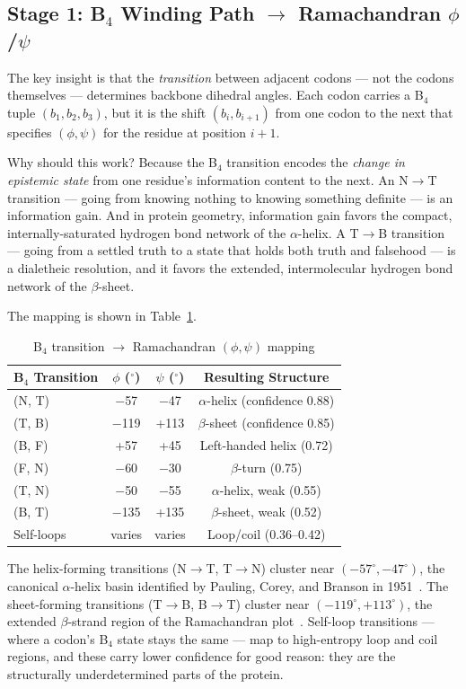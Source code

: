 \documentclass[11pt,a4paper,twocolumn]{article}
\begin{document}
\subsection{Stage 1: B$_4$ Winding Path $\to$ Ramachandran $\phi$/$\psi$}

The key insight is that the \emph{transition} between adjacent codons — not the codons themselves — determines backbone dihedral angles. Each codon carries a B$_4$ tuple $(b_1, b_2, b_3)$, but it is the shift $(b_i, b_{i+1})$ from one codon to the next that specifies $(\phi, \psi)$ for the residue at position $i+1$.

Why should this work? Because the B$_4$ transition encodes the \emph{change in epistemic state} from one residue's information content to the next. An N$\to$T transition — going from knowing nothing to knowing something definite — is an information gain. And in protein geometry, information gain favors the compact, internally-saturated hydrogen bond network of the $\alpha$-helix. A T$\to$B transition — going from a settled truth to a state that holds both truth and falsehood — is a dialetheic resolution, and it favors the extended, intermolecular hydrogen bond network of the $\beta$-sheet.

The mapping is shown in Table~\ref{tab:b4rama}.

\begin{table}[h]
\centering
\caption{B$_4$ transition $\to$ Ramachandran $(\phi,\psi)$ mapping}
\label{tab:b4rama}
\small
\begin{tabular}{lccc}
\toprule
B$_4$ Transition & $\phi$ ($^\circ$) & $\psi$ ($^\circ$) & Resulting Structure \\
\midrule
(N, T) & $-$57 & $-$47 & $\alpha$-helix (confidence 0.88) \\
(T, B) & $-$119 & +113 & $\beta$-sheet (confidence 0.85) \\
(B, F) & +57 & +45 & Left-handed helix (0.72) \\
(F, N) & $-$60 & $-$30 & $\beta$-turn (0.75) \\
(T, N) & $-$50 & $-$55 & $\alpha$-helix, weak (0.55) \\
(B, T) & $-$135 & +135 & $\beta$-sheet, weak (0.52) \\
Self-loops & varies & varies & Loop/coil (0.36--0.42) \\
\bottomrule
\end{tabular}
\end{table}

The helix-forming transitions (N$\to$T, T$\to$N) cluster near $(-57^\circ, -47^\circ)$, the canonical $\alpha$-helix basin identified by Pauling, Corey, and Branson in 1951~\cite{pauling1951}. The sheet-forming transitions (T$\to$B, B$\to$T) cluster near $(-119^\circ, +113^\circ)$, the extended $\beta$-strand region of the Ramachandran plot~\cite{ramachandran1963}. Self-loop transitions — where a codon's B$_4$ state stays the same — map to high-entropy loop and coil regions, and these carry lower confidence for good reason: they are the structurally underdetermined parts of the protein.
\end{document}
